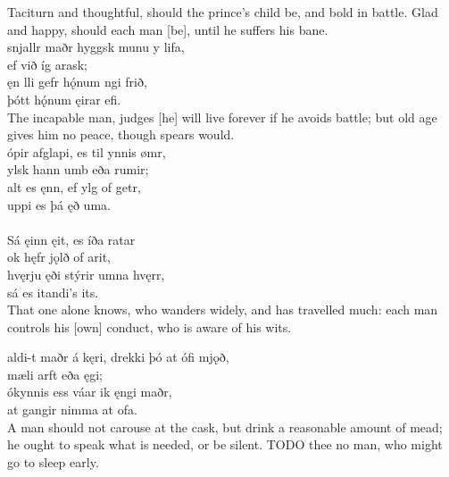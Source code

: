 \bvb Taciturn and thoughtful, should the prince's child be, and bold in battle. Glad and happy, should each man [be], until he suffers his bane. \\

\bva {}snjallr maðr \hld hyggsk munu y lifa, \\%
\ind ef við íg arask; \\%
ęn lli gefr \hld hǫ́num ngi frið, \\%
\ind þótt hǫ́num ęirar efi.\\%

\bvb The incapable man, judges [he] will live forever if he avoids battle; but old age gives him no peace, though spears would. \\

\bva {}ópir afglapi, \hld es til ynnis ømr, \\%
\ind {}ylsk hann umb eða rumir; \\%
alt es ęnn, \hld ef ylg of getr, \\%
\ind uppi es þá ęð uma.\\%

 \\

\bva Sá ęinn ęit, \hld es íða ratar \\%
\ind ok hęfr jǫlð of arit, \\%
hvęrju ęði \hld stýrir umna hvęrr, \\%
\ind sá es itandi's its.\\%

\bvb That one alone knows, who wanders widely, and has travelled much: each man controls his [own] conduct\footnotemark[25], who is aware of his wits. \\

\bva {}aldi-t maðr á kęri, \hld drekki þó at ófi mjǫð, \\%
\ind mæli arft eða ęgi; \\%
ókynnis ess \hld váar ik ęngi maðr, \\%
\ind at gangir nimma at ofa.\\%

\bvb A man should not carouse at the cask\footnotemark[27], but drink a reasonable amount of mead; he ought to speak what is needed, or be silent\footnotemark[26]. TODO thee no man, who might go to sleep early. \\

